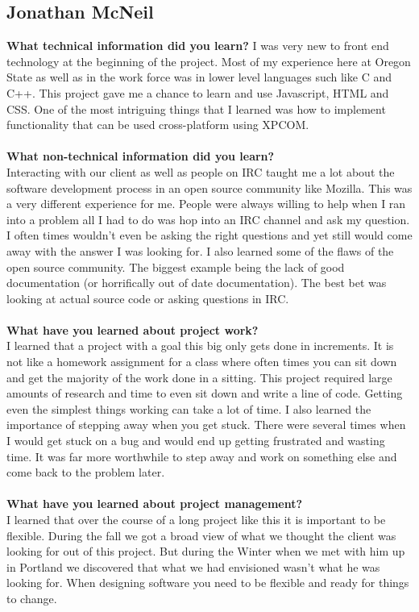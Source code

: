 \documentclass[12pt]{article}
\begin{document}
\subsection{Jonathan McNeil}
\textbf{What technical information did you learn?}
I was very new to front end technology at the beginning of the project.  Most of my experience here at Oregon State as well as
in the work force was in lower level languages such like C and C++. This project gave me a chance to learn and use Javascript, HTML and CSS.  One of the most intriguing things that I learned was how to implement functionality that can be used cross-platform using XPCOM. 
\\\\
\textbf{What non-technical information did you learn?}\\
Interacting with our client as well as people on IRC taught me a lot about the software development process in an open source community like Mozilla.  This was a very different experience for me.  People were always willing to help when I ran into a problem all I had to do was hop into an IRC channel and ask my question.  I often times wouldn't even be asking the right questions and yet still would come away with the answer I was looking for. I also learned some of the flaws of the open source community.  The biggest example being the lack of good documentation (or horrifically out of date documentation).  The best bet was looking at actual source code or asking questions in IRC.  
\\\\
\textbf{What have you learned about project work?}\\
I learned that a project with a goal this big only gets done in increments.  It is not
like a homework assignment for a class where often times you can sit down and get the majority of the work done 
in a sitting.  This project required large amounts of research and time to even sit down and write a line of code.  Getting even the simplest things working can take a lot of time. I also learned the importance of stepping away when you get stuck.  There were several times when I would get stuck on a bug and would end up getting frustrated and wasting time.  It was far more worthwhile to step away and work on something else and come back to the problem later. 
\\\\ 
\textbf{What have you learned about project management?}\\
I learned that over the course of a long project like this it is important to be flexible.  During the fall we got a broad view of what we thought the client was looking for out of this project. But during the Winter when we met with him up in Portland we discovered that what we had envisioned wasn't what he was looking for.  When designing software you need to be flexible and ready for things to change.
\end{document}
